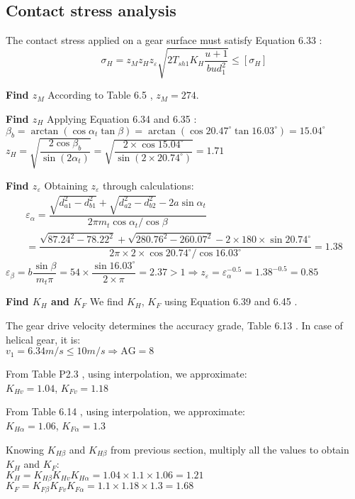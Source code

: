 \subsection{Contact stress analysis}
The contact stress applied on a gear surface must satisfy Equation 6.33 \cite{tk1}:
\[
\sigma_H = z_Mz_Hz_\varepsilon\sqrt{2T_{sh1}K_H\dfrac{u+1}{bud_1^2}} \leq [\sigma_H]
\]

\textbf{Find $ z_M $} According to Table 6.5 \cite{tk1}, $ z_M = 274 $.

\textbf{Find $ z_H $} Applying Equation 6.34 \cite{tk1} and 6.35 \cite{tk1}:\\
$ \beta_b = \arctan\left( \cos\alpha_t\tan\beta\right) = \arctan\left( \cos 20.47^\circ\tan 16.03^\circ\right) = 15.04^\circ$\\
$ z_H = \sqrt{\dfrac{2\cos\beta_b}{\sin(2\alpha_t)}} = \sqrt{\dfrac{2\times\cos 15.04^\circ}{\sin(2\times 20.74^\circ)}} = 1.71$

\textbf{Find $ z_\varepsilon $} Obtaining $ z_\varepsilon $ through calculations:
\begin{multline*}
\varepsilon_\alpha = \dfrac{\sqrt{d_{a1}^2-d_{b1}^2}+\sqrt{d_{a2}^2-d_{b2}^2}-2a\sin\alpha_t}{2\pi m_t{\cos\alpha_t}/{\cos\beta}}\\
= \dfrac{\sqrt{87.24^2-78.22^2}+\sqrt{280.76^2-260.07^2}-2\times 180\times\sin 20.74^\circ}{2\pi \times 2\times{\cos 20.74^\circ}/{\cos 16.03^\circ}} = 1.38
\end{multline*}
$ \varepsilon_\beta = b\dfrac{\sin\beta}{m_t\pi} = 54\times\dfrac{\sin 16.03^\circ}{2\times\pi}=2.37 >1 \Rightarrow z_\varepsilon = \varepsilon_\alpha^{-0.5} = 1.38^{-0.5} = 0.85 $

\textbf{Find $ K_H $ and $ K_F $} We find $ K_H $, $ K_F $ using Equation 6.39 and 6.45 \cite{tk1}.

The gear drive velocity determines the accuracy grade, Table 6.13 \cite{tk1}. In case of helical gear, it is:\\
$ v_1=6.34 \unit{m/s} \leq 10 \unit{m/s}\Rightarrow \text{AG} = 8 $

From Table P2.3 \cite{tk1}, using interpolation, we approximate:\\
$ K_{Hv} = 1.04$, $ K_{Fv} = 1.18$

From Table 6.14 \cite{tk1}, using interpolation, we approximate:\\
$ K_{H\alpha} = 1.06$, $ K_{F\alpha} = 1.3 $

Knowing $ K_{H\beta} $ and $ K_{H\beta} $ from previous section, multiply all the values to obtain $ K_H $ and $ K_F $:\\
$ K_H = K_{H\beta}K_{Hv}K_{H\alpha} = 1.04\times 1.1 \times 1.06  = 1.21 $\\
$ K_F = K_{F\beta}K_{Fv}K_{F\alpha} = 1.1\times 1.18 \times 1.3 = 1.68 $

